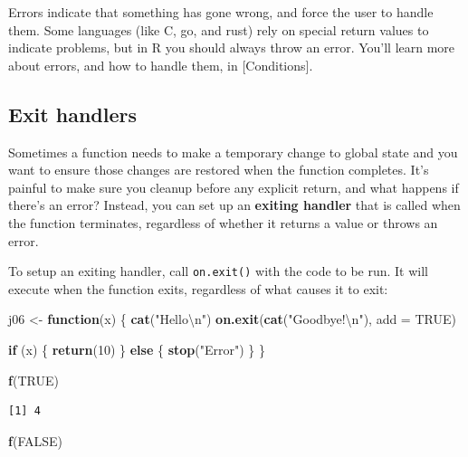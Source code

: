 \documentclass[]{book}
\newenvironment{Shaded}{\begin{snugshade}}{\end{snugshade}}
\newcommand{\CharTok}[1]{\textcolor[rgb]{0.31,0.60,0.02}{#1}}
\newcommand{\ControlFlowTok}[1]{\textcolor[rgb]{0.13,0.29,0.53}{\textbf{#1}}}
\newcommand{\DataTypeTok}[1]{\textcolor[rgb]{0.13,0.29,0.53}{#1}}
\newcommand{\DecValTok}[1]{\textcolor[rgb]{0.00,0.00,0.81}{#1}}
\newcommand{\KeywordTok}[1]{\textcolor[rgb]{0.13,0.29,0.53}{\textbf{#1}}}
\newcommand{\NormalTok}[1]{#1}
\newcommand{\OtherTok}[1]{\textcolor[rgb]{0.56,0.35,0.01}{#1}}
\newcommand{\StringTok}[1]{\textcolor[rgb]{0.31,0.60,0.02}{#1}}
\theoremstyle{definition}
\theoremstyle{definition}
\theoremstyle{definition}
\theoremstyle{remark}
\begin{document}
Errors indicate that something has gone wrong, and force the user to
handle them. Some languages (like C, go, and rust) rely on special
return values to indicate problems, but in R you should always throw an
error. You'll learn more about errors, and how to handle them, in
{[}Conditions{]}.

\hypertarget{on-exit}{%
\subsection{Exit handlers}\label{on-exit}}

Sometimes a function needs to make a temporary change to global state
and you want to ensure those changes are restored when the function
completes. It's painful to make sure you cleanup before any explicit
return, and what happens if there's an error? Instead, you can set up an
\textbf{exiting handler} that is called when the function terminates,
regardless of whether it returns a value or throws an error.

To setup an exiting handler, call \texttt{on.exit()} with the code to be
run. It will execute when the function exits, regardless of what causes
it to exit:

\begin{Shaded}
\begin{Highlighting}[]
\NormalTok{j06 <-}\StringTok{ }\ControlFlowTok{function}\NormalTok{(x) \{}
  \KeywordTok{cat}\NormalTok{(}\StringTok{"Hello}\CharTok{\textbackslash{}n}\StringTok{"}\NormalTok{)}
  \KeywordTok{on.exit}\NormalTok{(}\KeywordTok{cat}\NormalTok{(}\StringTok{"Goodbye!}\CharTok{\textbackslash{}n}\StringTok{"}\NormalTok{), }\DataTypeTok{add =} \OtherTok{TRUE}\NormalTok{)}
  
  \ControlFlowTok{if}\NormalTok{ (x) \{}
    \KeywordTok{return}\NormalTok{(}\DecValTok{10}\NormalTok{)}
\NormalTok{  \} }\ControlFlowTok{else}\NormalTok{ \{}
    \KeywordTok{stop}\NormalTok{(}\StringTok{"Error"}\NormalTok{)}
\NormalTok{  \}}
\NormalTok{\}}

\KeywordTok{f}\NormalTok{(}\OtherTok{TRUE}\NormalTok{)}
\end{Highlighting}
\end{Shaded}

\begin{verbatim}
[1] 4
\end{verbatim}

\begin{Shaded}
\begin{Highlighting}[]
\KeywordTok{f}\NormalTok{(}\OtherTok{FALSE}\NormalTok{)}
\end{Highlighting}
\end{Shaded}
\end{document}
